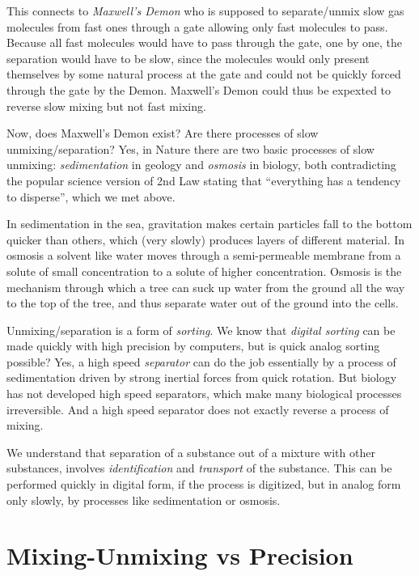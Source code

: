 This connects to \emph{Maxwell's Demon} who is supposed to separate/unmix slow
gas molecules from fast ones through a gate allowing only fast molecules 
to pass. Because all fast molecules would have to pass through the gate,
one by one, the separation would have to be slow, since the molecules
would only present themselves by some natural process at the gate
and could not be quickly forced through the gate by the Demon.
Maxwell's Demon could thus be expexted to reverse slow mixing but not
fast mixing.

Now, does Maxwell's Demon exist? Are there processes of slow 
unmixing/separation?
Yes, in Nature there are two basic processes of slow unmixing:
\emph{sedimentation} in geology and \emph{osmosis} in biology,
both contradicting the popular science version of 2nd Law stating that 
``everything has a tendency to disperse'', which we met above.

In sedimentation in the sea, gravitation makes certain particles
fall to the bottom quicker than others, which (very slowly) produces
layers of different material. In osmosis a solvent like water
moves through a semi-permeable membrane from a solute of small
concentration to a solute of higher concentration. Osmosis is the mechanism
through which a tree can suck up water from the ground all the way to
the top of the tree, and thus separate water out of the ground into
the cells. 

Unmixing/separation is a form of \emph{sorting}. We know that 
\emph{digital sorting}
can be made quickly with high precision by computers, but is   
quick analog sorting possible? Yes, a high speed \emph{separator}
can do the job essentially by a process of sedimentation 
driven by strong inertial forces from quick rotation. But biology has
not developed high speed separators, which make many biological processes
irreversible. And a high speed separator does not exactly reverse a process
of mixing.
 
We understand that separation of a substance out of
a mixture with other substances, involves \emph{identification}
and \emph{transport} of the substance. This can be performed quickly 
in digital form, if the process is digitized, but in analog form only slowly,
by processes like sedimentation or osmosis.  

\section{Mixing-Unmixing vs Precision}

